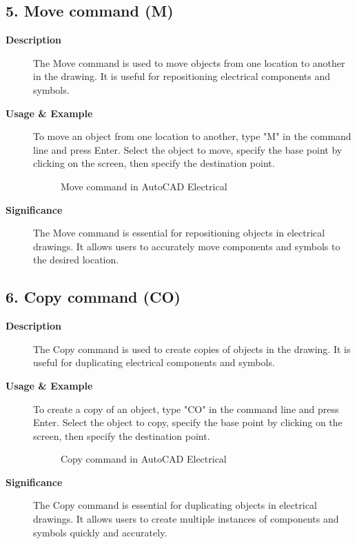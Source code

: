 \documentclass[12pt]{article}
\begin{document}
\subsection*{5. Move command (M)}
\begin{description}
    \item [\textbf{Description}] The Move command is used to move objects from one location to another in the drawing. It is useful for repositioning electrical components and symbols.
    \item [\textbf{Usage \& Example}]To move an object from one location to another, type "M" in the command line and press Enter. Select the object to move, specify the base point by clicking on the screen, then specify the destination point.
          \begin{figure}[H]
              \centering
              \caption{Move command in AutoCAD Electrical}
          \end{figure}
    \item [\textbf{Significance}] The Move command is essential for repositioning objects in electrical drawings. It allows users to accurately move components and symbols to the desired location.
\end{description}

\subsection*{6. Copy command (CO)}
\begin{description}
    \item [\textbf{Description}] The Copy command is used to create copies of objects in the drawing. It is useful for duplicating electrical components and symbols.
    \item [\textbf{Usage \& Example}] To create a copy of an object, type "CO" in the command line and press Enter. Select the object to copy, specify the base point by clicking on the screen, then specify the destination point.
          \begin{figure}[H]
              \centering
              \caption{Copy command in AutoCAD Electrical}
          \end{figure}
    \item [\textbf{Significance}] The Copy command is essential for duplicating objects in electrical drawings. It allows users to create multiple instances of components and symbols quickly and accurately.
\end{description}
\end{document}
